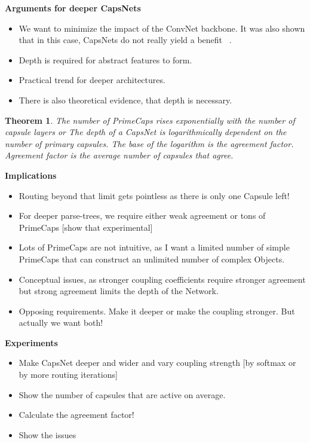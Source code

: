 \documentclass{article}
\newtheorem{theorem}{Theorem}
\begin{document}
\textbf{Arguments for deeper CapsNets}
\begin{itemize}
	\item We want to minimize the impact of the ConvNet backbone. It was also shown that in this case, CapsNets do not really yield a benefit ~\cite{acml/PaikKK19}.
	\item Depth is required for abstract features to form.
	\item Practical trend for deeper architectures.
	\item There is also theoretical evidence, that depth is necessary.
\end{itemize}

\begin{theorem}
	The number of PrimeCaps rises exponentially with the number of capsule layers or
	The depth of a CapsNet is logarithmically dependent on the number of primary capsules.
	The base of the logarithm is the agreement factor.
	Agreement factor is the average number of capsules that agree.
\end{theorem}

\textbf{Implications}
\begin{itemize}
	\item Routing beyond that limit gets pointless as there is only one Capsule left!
	\item For deeper parse-trees, we require either weak agreement or tons of PrimeCaps [show that experimental]
	\item Lots of PrimeCaps are not intuitive, as I want a limited number of simple PrimeCaps that can construct an unlimited number of complex Objects.
	\item Conceptual issues, as stronger coupling coefficients require stronger agreement but strong agreement limits the depth of the Network.
	\item Opposing requirements. Make it deeper or make the coupling stronger. But actually we want both!
\end{itemize}

\textbf{Experiments}
\begin{itemize}
	\item Make CapsNet deeper and wider and vary coupling strength [by softmax or by more routing iterations]
	\item Show the number of capsules that are active on average.
	\item Calculate the agreement factor!
	\item Show the issues
\end{itemize}
\end{document}
